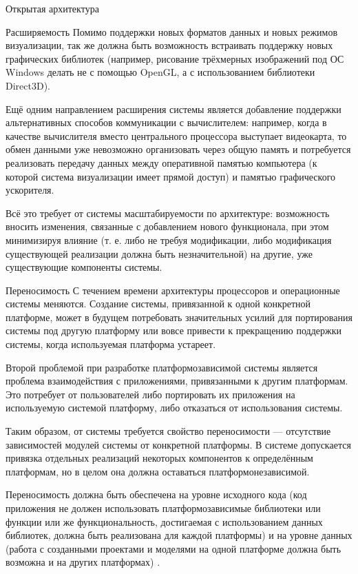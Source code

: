 \documentclass[a4paper,12pt]{extarticle}
\begin{document}
\begin{subsection}{Открытая архитектура}
\begin{subsubsection}{Расширяемость}
        Помимо поддержки новых форматов данных и новых режимов визуализации, так же должна быть возможность встраивать поддержку новых графических библиотек (например, рисование трёхмерных изображений под ОС Windows делать не с помощью OpenGL, а с использованием библиотеки Direct3D). 
        
        Ещё одним направлением расширения системы является добавление поддержки альтернативных способов коммуникации с вычислителем: например, когда в качестве вычислителя вместо центрального процессора выступает видеокарта, то обмен данными уже невозможно организовать через общую память и потребуется реализовать передачу данных между оперативной памятью компьютера (к которой система визуализации имеет прямой доступ) и памятью графического ускорителя.
        
        Всё это требует от системы масштабируемости по архитектуре: возможность вносить изменения, связанные с добавлением нового функционала, при этом минимизируя влияние (т. е. либо не требуя модификации, либо модификация существующей реализации должна быть незначительной) на другие, уже существующие компоненты системы.
    \end{subsubsection}
        
    \begin{subsubsection}{Переносимость}
        С течением времени архитектуры процессоров и операционные системы меняются. Создание системы, привязанной к одной конкретной платформе, может в будущем потребовать значительных усилий для портирования системы под другую платформу или вовсе привести к прекращению поддержки системы, когда используемая платформа устареет.
        
        Второй проблемой при разработке платформозависимой системы является проблема взаимодействия с приложениями, привязанными к другим платформам. Это потребует от пользователей либо портировать их приложения на используемую системой платформу, либо отказаться от использования системы.
        
        Таким образом, от системы требуется свойство переносимости --- отсутствие  зависимостей модулей системы от конкретной платформы. В системе допускается привязка отдельных реализаций некоторых компонентов к определённым платформам, но в целом она должна оставаться платформонезависимой.
        
        Переносимость должна быть обеспечена на уровне исходного кода (код приложения не должен использовать платформозависимые библиотеки или функции или же функциональность, достигаемая с использованием данных библиотек, должна быть реализована для каждой платформы) и на уровне данных (работа с созданными проектами и моделями на одной платформе должна быть возможна и на других платформах) \cite{ieee}.
    \end{subsubsection}
        

\end{subsection}
\end{document}
